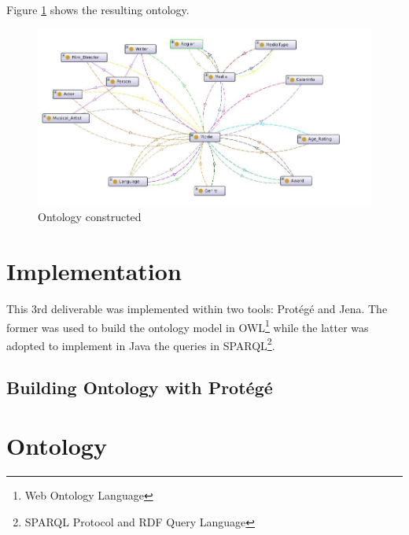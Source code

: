 \documentclass[a4paper,10pt]{article}
\begin{document}
Figure \ref{fig:onto} shows the resulting ontology.

\begin{figure}[h!]
 \centering
 \includegraphics[width=\textwidth]{movie_ontology.jpg}
 \caption{Ontology constructed}
 \label{fig:onto}
\end{figure}



\section{Implementation}

This 3rd deliverable was implemented within two tools: Protégé\cite{protege} and Jena\cite{jena}. The former was used to build the ontology model in OWL\footnote{Web Ontology Language} while the latter was adopted to implement in Java the queries in SPARQL\footnote{SPARQL Protocol and RDF Query Language}.

\subsection{Building Ontology with Protégé}





\appendix

\section{Ontology}





\end{document}
